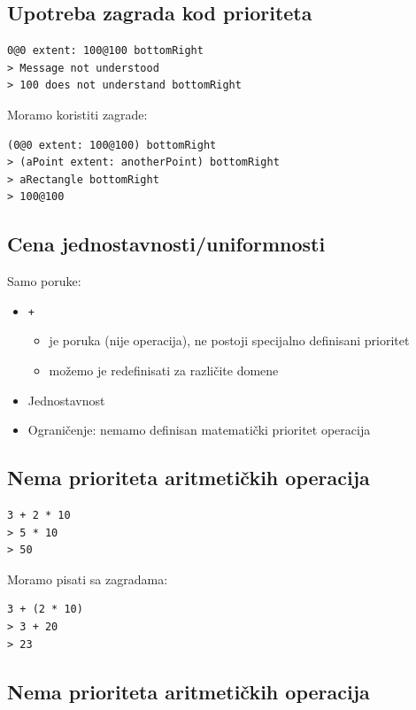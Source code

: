 \documentclass[presentation]{beamer}
\begin{document}
\subsection{Upotreba zagrada kod prioriteta}
\label{sec:org9640650}

\begin{verbatim}
0@0 extent: 100@100 bottomRight
> Message not understood
> 100 does not understand bottomRight
\end{verbatim}

Moramo koristiti zagrade:

\begin{verbatim}
(0@0 extent: 100@100) bottomRight
> (aPoint extent: anotherPoint) bottomRight
> aRectangle bottomRight
> 100@100
\end{verbatim}

\subsection{Cena jednostavnosti/uniformnosti}
\label{sec:orgb837395}

Samo poruke:

\begin{itemize}
\item \texttt{+}
\begin{itemize}
\item je poruka (nije operacija), ne postoji specijalno definisani prioritet
\item možemo je redefinisati za različite domene
\end{itemize}
\item Jednostavnost
\item Ograničenje: nemamo definisan matematički prioritet operacija
\end{itemize}

\subsection{Nema prioriteta aritmetičkih operacija}
\label{sec:org690c39b}

\begin{verbatim}
3 + 2 * 10
> 5 * 10
> 50
\end{verbatim}

Moramo pisati sa zagradama:

\begin{verbatim}
3 + (2 * 10)
> 3 + 20
> 23
\end{verbatim}

\subsection{Nema prioriteta aritmetičkih operacija}
\label{sec:org42c5dd6}
\end{document}
